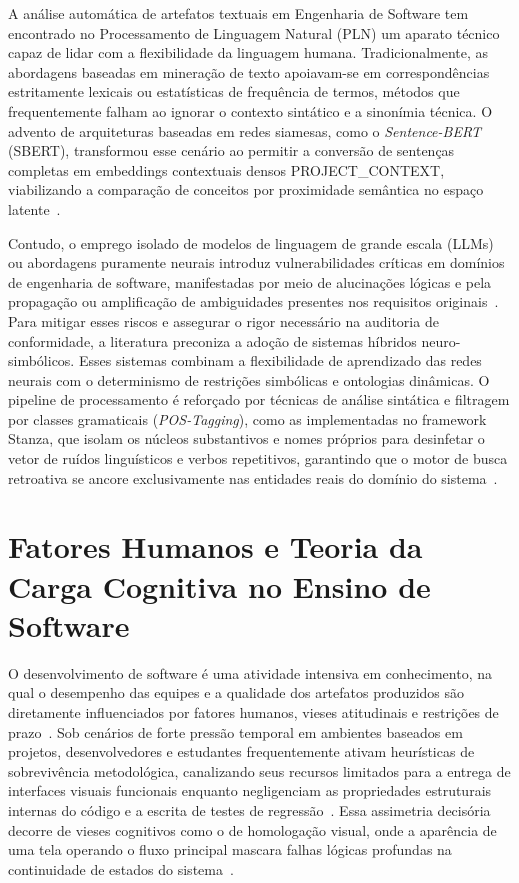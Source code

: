 \documentclass[ruledheader]{abnt_UFF}[abntex2]
\begin{document}
A análise automática de artefatos textuais em Engenharia de Software tem encontrado no Processamento de Linguagem Natural (PLN) um aparato técnico capaz de lidar com a flexibilidade da linguagem humana. Tradicionalmente, as abordagens baseadas em mineração de texto apoiavam-se em correspondências estritamente lexicais ou estatísticas de frequência de termos, métodos que frequentemente falham ao ignorar o contexto sintático e a sinonímia técnica. O advento de arquiteturas baseadas em redes siamesas, como o \textit{Sentence-BERT} (SBERT), transformou esse cenário ao permitir a conversão de sentenças completas em embeddings contextuais densos PROJECT\_CONTEXT, viabilizando a comparação de conceitos por proximidade semântica no espaço latente~\cite{tahvili2025comparative}.

Contudo, o emprego isolado de modelos de linguagem de grande escala (LLMs) ou abordagens puramente neurais introduz vulnerabilidades críticas em domínios de engenharia de software, manifestadas por meio de alucinações lógicas e pela propagação ou amplificação de ambiguidades presentes nos requisitos originais~\cite{zhao2024large}. Para mitigar esses riscos e assegurar o rigor necessário na auditoria de conformidade, a literatura preconiza a adoção de sistemas híbridos neuro-simbólicos. Esses sistemas combinam a flexibilidade de aprendizado das redes neurais com o determinismo de restrições simbólicas e ontologias dinâmicas. O pipeline de processamento é reforçado por técnicas de análise sintática e filtragem por classes gramaticais (\textit{POS-Tagging}), como as implementadas no framework Stanza, que isolam os núcleos substantivos e nomes próprios para desinfetar o vetor de ruídos linguísticos e verbos repetitivos, garantindo que o motor de busca retroativa se ancore exclusivamente nas entidades reais do domínio do sistema~\cite{tahvili2025comparative}.

\section{Fatores Humanos e Teoria da Carga Cognitiva no Ensino de Software}

O desenvolvimento de software é uma atividade intensiva em conhecimento, na qual o desempenho das equipes e a qualidade dos artefatos produzidos são diretamente influenciados por fatores humanos, vieses atitudinais e restrições de prazo~\cite{gilal2023key}. Sob cenários de forte pressão temporal em ambientes baseados em projetos, desenvolvedores e estudantes frequentemente ativam heurísticas de sobrevivência metodológica, canalizando seus recursos limitados para a entrega de interfaces visuais funcionais enquanto negligenciam as propriedades estruturais internas do código e a escrita de testes de regressão~\cite{salman2023confirmation}. Essa assimetria decisória decorre de vieses cognitivos como o de homologação visual, onde a aparência de uma tela operando o fluxo principal mascara falhas lógicas profundas na continuidade de estados do sistema~\cite{salman2023confirmation}.
\end{document}
